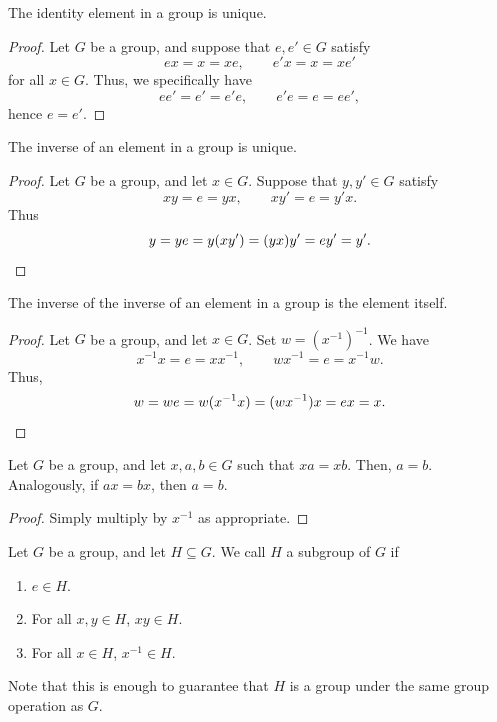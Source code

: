 \documentclass[11pt]{article}
\theoremstyle{definition}
\theoremstyle{remark}
\numberwithin{equation}{section}
\begin{document}
    \begin{lemma}
        The identity element in a group is unique.
    \end{lemma}
    \begin{proof}
        Let $G$ be a group, and suppose that $e, e' \in G$ satisfy \[
            ex = x = xe, \qquad e'x = x = xe'
        \] for all $x \in G$. Thus, we specifically have \[
            ee' = e' = e'e, \qquad e'e = e = ee',
        \] hence $e = e'$.
    \end{proof}

    \begin{lemma}
        The inverse of an element in a group is unique.
    \end{lemma}
    \begin{proof}
        Let $G$ be a group, and let $x \in G$. Suppose that $y, y' \in G$ satisfy \[
            xy = e = yx, \qquad xy' = e = y'x.
        \] Thus \[
            y = ye = y(xy') = (yx)y' = ey' = y'. \qedhere
        \] 
    \end{proof}

    \begin{lemma}
        The inverse of the inverse of an element in a group is the element itself.
    \end{lemma}
    \begin{proof}
        Let $G$ be a group, and let $x \in G$. Set $w = (x^{-1})^{-1}$. We have \[
            x^{-1}x = e = x x^{-1}, \qquad wx^{-1} = e = x^{-1}w.
        \] Thus, \[
            w = we = w(x^{-1}x) = (wx^{-1})x = ex = x. \qedhere
        \] 
    \end{proof}

    \begin{lemma}
        Let $G$ be a group, and let $x, a, b \in G$ such that $xa = xb$. Then, $a =
        b$. Analogously, if $ax = bx$, then $a = b$.
    \end{lemma}
    \begin{proof}
        Simply multiply by $x^{-1}$ as appropriate.
    \end{proof}

    \begin{definition}
        Let $G$ be a group, and let $H \subseteq G$. We call $H$ a subgroup of $G$ if
        \begin{enumerate}
        \itemsep0em
            \item $e \in H$.
            \item For all $x, y \in H$, $xy \in H$.
            \item For all $x \in H$, $x^{-1} \in H$.
        \end{enumerate}
        Note that this is enough to guarantee that $H$ is a group under the same
        group operation as $G$.
    \end{definition}
\end{document}
